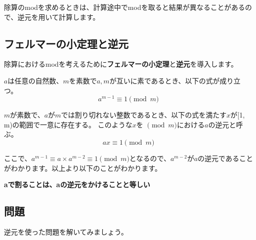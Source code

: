除算のmodを求めるときは、計算途中でmodを取ると結果が異なることがあるので、逆元を用いて計算します。

\subsection{フェルマーの小定理と逆元}

除算におけるmodを考えるために\textbf{フェルマーの小定理}と\textbf{逆元}を導入します。

\begin{tcolorbox}[enhanced,title=フェルマーの小定理, 
    attach boxed title to top left, 
    colback=white!95!blue,
    colbacktitle=white!10!blue!50!black,
    drop fuzzy shadow,
    boxrule=0.25mm,
    ]
    $a$は任意の自然数、$m$を素数で$a, m$が互いに素であるとき、以下の式が成り立つ。
    \begin{equation*}
        a^{m-1} \equiv 1 \pmod{m}
    \end{equation*}
  \end{tcolorbox}

\begin{tcolorbox}[enhanced,title=逆元, 
    attach boxed title to top left, 
    colback=white!95!blue,
    colbacktitle=white!10!blue!50!black,
    drop fuzzy shadow,
    boxrule=0.25mm,
    ]
    $m$が素数で、$a$が$m$では割り切れない整数であるとき、以下の式を満たす$x$が[1, m)の範囲で一意に存在する。
    このような$x$を $\pmod m$における$a$の逆元と呼ぶ。
    \begin{equation*}
        a x \equiv 1 \pmod{m}
    \end{equation*}
  \end{tcolorbox}
  ここで、$a^{m-1} \equiv a \times a^{m-2} \equiv 1 \pmod{m}$となるので、$a^{m-2}$が$a$の逆元であることがわかります。以上より以下のことがわかります。

  \vspace{0.5cm}

  \begin{center}
    \textbf{aで割ることは、aの逆元をかけることと等しい}
  \end{center}

\subsection{問題}
逆元を使った問題を解いてみましょう。

